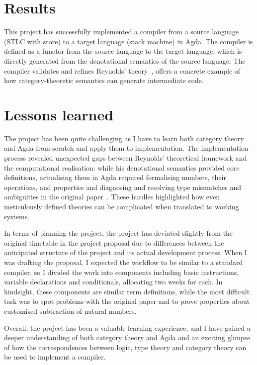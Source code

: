 \documentclass[12pt,a4paper]{report}
\theoremstyle{definition}
\begin{document}
    \section{Results}
    This project has successfully implemented a compiler from a source language (STLC with store) to a target language (stack machine) in Agda. The compiler is defined as a functor from the source language to the target language, which is directly generated from the denotational semantics of the source language. The compiler validates and refines Reynolds' theory~\autocite{Reynolds}, offers a concrete example of how category-theoretic semantics can generate intermediate code.

    \section{Lessons learned}
    The project has been quite challenging as I have to learn both category theory and Agda from scratch and apply them to implementation. The implementation process revealed unexpected gaps between Reynolds' theoretical framework and the computational realisation: while his denotational semantics provided core definitions, actualising them in Agda required formalising numbers, their operations, and properties and diagnosing and resolving type mismatches and ambiguities in the original paper~\autocite{Reynolds}. These hurdles highlighted how even meticulously defined theories can be complicated when translated to working systems.


    In terms of planning the project, the project has deviated slightly from the original timetable in the project proposal due to differences
    between the anticipated structure of the project and its actual development process. When I was drafting the proposal, I expected the workflow to be similar to a standard compiler, so I divided the work into components including basic instructions, variable declarations and conditionals, allocating two weeks for each. In hindsight, these components are similar term definitions, while the most difficult task was to spot problems with the original paper and to prove properties about customised subtraction of natural numbers. 

    Overall, the project has been a valuable learning experience, and I have gained a deeper understanding of both category theory and Agda and an exciting glimpse of how the correspondences between logic, type theory and category theory can be used to implement a compiler.
\end{document}
